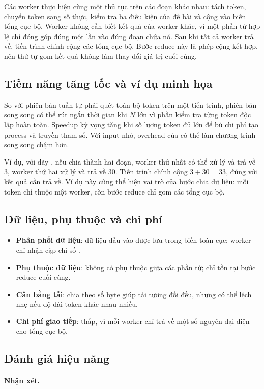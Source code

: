 Các worker thực hiện cùng một thủ tục trên các đoạn khác nhau: tách token, chuyển token sang số thực, kiểm tra ba điều kiện của đề bài và cộng vào biến tổng cục bộ. Worker không cần biết kết quả của worker khác, vì một phần tử hợp lệ chỉ đóng góp đúng một lần vào đúng đoạn chứa nó. Sau khi tất cả worker trả về, tiến trình chính cộng các tổng cục bộ. Bước reduce này là phép cộng kết hợp, nên thứ tự gom kết quả không làm thay đổi giá trị cuối cùng.

\subsection{Tiềm năng tăng tốc và ví dụ minh họa}
So với phiên bản tuần tự phải quét toàn bộ token trên một tiến trình, phiên bản song song có thể rút ngắn thời gian khi $N$ lớn vì phần kiểm tra từng token độc lập hoàn toàn. Speedup kỳ vọng tăng khi số lượng token đủ lớn để bù chi phí tạo process và truyền tham số. Với input nhỏ, overhead của  có thể làm chương trình song song chậm hơn.

Ví dụ, với dãy , nếu chia thành hai đoạn, worker thứ nhất có thể xử lý  và trả về $3$, worker thứ hai xử lý  và trả về $30$. Tiến trình chính cộng $3 + 30 = 33$, đúng với kết quả cần trả về. Ví dụ này cũng thể hiện vai trò của bước chia dữ liệu: mỗi token chỉ thuộc một worker, còn bước reduce chỉ gom các tổng cục bộ.

\subsection{Dữ liệu, phụ thuộc và chi phí}
\begin{itemize}
  \item \textbf{Phân phối dữ liệu}: dữ liệu đầu vào được lưu trong biến toàn cục; worker chỉ nhận cặp chỉ số .
  \item \textbf{Phụ thuộc dữ liệu}: không có phụ thuộc giữa các phần tử; chỉ tồn tại bước reduce cuối cùng.
  \item \textbf{Cân bằng tải}: chia theo số byte giúp tải tương đối đều, nhưng có thể lệch nhẹ nếu độ dài token khác nhau nhiều.
  \item \textbf{Chi phí giao tiếp}: thấp, vì mỗi worker chỉ trả về một số nguyên đại diện cho tổng cục bộ.
\end{itemize}

\subsection{Đánh giá hiệu năng}

\paragraph{Nhận xét.}
